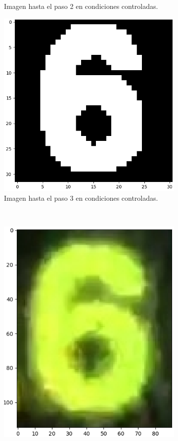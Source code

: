 \begin{figure}[hp!]
\begin{subfigure}[t]{0.3\textwidth}
        \caption{Imagen hasta el paso 2 en condiciones controladas.}
        \label{fig:good_conditions_padded}
    \end{subfigure}
    \hfill
    \begin{subfigure}[t]{0.3\textwidth}
        \centering
        \includegraphics[height=\x1cm]{3_Reconocimiento/Figs/test_sample6_good_otsu}
        \caption{Imagen hasta el paso 3 en condiciones controladas.}
    \end{subfigure}
    \\[+1em]
    \begin{subfigure}[t]{0.3\textwidth}
        \centering
        \includegraphics[height=\x1cm]{3_Reconocimiento/Figs/test_sample6_bad_original1}

\end{subfigure}
\end{figure}
